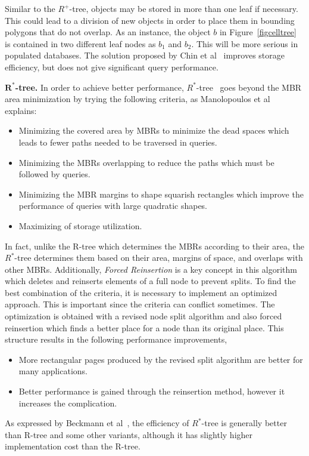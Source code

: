 \documentclass[a4paper,12pt]{article}
\begin{document}
Similar to the $R^+$-tree, objects may be stored in more than one leaf if necessary. This could lead to a division of new objects in order to place them in bounding polygons that do not overlap. 
As an instance, the object $b$ in Figure~\ref{figcelltree} is contained in two different leaf nodes as $b_1$ and $b_2$.
This will be more serious in populated databases. The solution proposed by Chin et al~\cite{survey} improves storage efficiency, but does not give significant query performance. 

\textbf{$\boldsymbol{R^*}$-tree.}
In order to achieve better performance, $R^*$-tree~\cite{rstartree} goes beyond the MBR area minimization by trying the following criteria, as Manolopoulos et al~\cite{Manolopoulos:2005} explains:
\begin{itemize}
\item Minimizing the covered area by MBRs to minimize the dead spaces which leads to fewer paths needed to be traversed in queries. 
\item Minimizing the MBRs overlapping to reduce the paths which must be followed by queries.
\item Minimizing the MBR margins to shape squarish rectangles which improve the performance of queries with large quadratic shapes.
\item Maximizing of storage utilization. 
\end{itemize}
In fact, unlike the R-tree which determines the MBRs according to their area, the $R^*$-tree determines them based on their area, margins of space, and overlaps with other MBRs. Additionally, \textit{Forced Reinsertion} is a key concept in this algorithm which deletes and reinserts elements of a full node to prevent splits.
To find the best combination of the criteria, it is necessary to implement an optimized approach. This is important since the criteria can conflict sometimes. The optimization is obtained with a revised node split algorithm and also forced reinsertion which finds a better place for a node than its original place. This structure results in the following performance improvements,
\begin{itemize}
\item More rectangular pages produced by the revised split algorithm are better for many applications.
\item Better performance is gained through the reinsertion method, however it increases the complication.
\end{itemize}
As expressed by Beckmann et al~\cite{rstartree}, the efficiency of $R^*$-tree is generally better than R-tree and some other variants, although it has slightly higher implementation cost than the R-tree.
\end{document}

